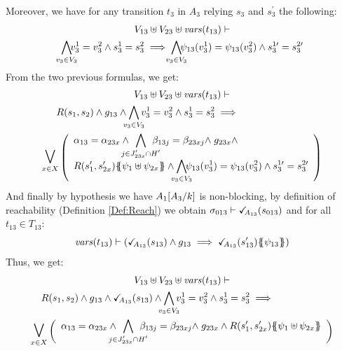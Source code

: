 \documentclass[runningheads]{llncs}
\begin{document}
\begin{enumerate}
Moreover, we have  for any transition $t_3$ in $A_3$ relying $s_3$ and $s^{\prime}_3$ the following:
\begin{multline*}
V_{13} \uplus V_{23}  \uplus \fvars{t_{13}} \vdash\\
\bigwedge_\subbox{v_3\in V_3}\!\! v^1_3=v^2_3  \wedge s^1_3 = s^2_3 \implies \bigwedge_\subbox{v_3\in V_3}\!\! \psi_{13}(v^1_3)=\psi_{13}(v^2_3)  \wedge s^{1\prime}_3 = s^{2\prime}_3 
 \end{multline*}	
From the two previous formulas, we get:
\begin{multline*}
V_{13} \uplus V_{23} \uplus \fvars{t_{13}}  \vdash\\
R\mpar{s_1, s_{2}} \wedge g_{13}  \land \bigwedge_\subbox{v_3\in V_3} v^1_3=v^2_3 \wedge s^1_3 = s^2_3
\implies \hspace{7em} \\ \operatorname*{\bigsymb{\bigvee}}_{x \in X} \mpar{\everymath{\displaystyle}
\begin{array}{l}
			\alpha_{13} = \alpha_{23x} \wedge \bigwedge_\subbox{j \in J'_{23x} \cap H'} \beta_{13j} = \beta_{23xj} \nwedge g_{23x}\land\\
			  R\mpar{s'_1, s'_{2x}}\psubst{\psi_1 \uplus \psi_{2x}} \wedge
 \bigwedge_\subbox{v_3\in V_3}\!\! \psi_{13}(v^1_3)=\psi_{13}(v^2_3) \wedge s^{1\prime}_3 = s^{2\prime}_3
		\end{array}}   
\end{multline*}
And finally by hypothesis we have  \(A_1{\left[A_3\middle/k\right]}\) is non-blocking,   by definition of reachability (Definition \ref{Def:Reach}) we obtain $ \sigma_{013} \vdash \checkmark_{\!\! A_{13}}{\left(s_{013}\right)}$ and for all $t_{13} \in T_{13}$:
\[ \fvars{t_{13}} \vdash \left(\reach{A_{13}}\mpar{s_{13}} \wedge g_{13} \implies \reach{A_{13}}\mpar{s_{13}'}\psubst{\psi_{13}}\right) \]	
Thus, we get:
\begin{multline*}
V_{13} \uplus V_{23} \uplus  \fvars{t_{13}} \vdash\\
R\mpar{s_1, s_{2}} \wedge g_{13}  \wedge \reach{A_{13}}\mpar{s_{13}}
\wedge \bigwedge_\subbox{v_3\in V_3}  v^1_3=v^2_3\wedge s^1_3=s^2_3
\implies \hspace{5em} \\ \operatorname*{\bigsymb{\bigvee}}_{x \in X} \mpar{\everymath{\displaystyle}
\begin{array}{l}
			\alpha_{13} = \alpha_{23x} \wedge \bigwedge_\subbox{j \in J'_{23x} \cap H'} \beta_{13j} = \beta_{23xj} \nwedge 	g_{23x} \wedge R\mpar{s'_1, s'_{2x}}\psubst{\psi_1 \uplus \psi_{2x}}\\

\end{array}}
\end{multline*}
\end{enumerate}
\end{document}
